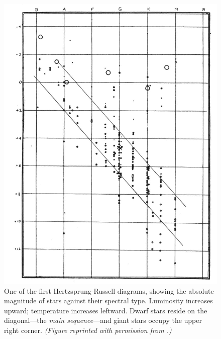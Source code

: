 \begin{figure}
    \centering
    \includegraphics[width=\textwidth]{pics/old_hr.png}
    \caption[Historical Hertzsprung-Russell Diagram]{One of the first Hertzsprung-Russell diagrams, showing the absolute magnitude of stars against their spectral type. 
        Luminosity increases upward; temperature increases leftward. 
        Dwarf stars reside on the diagonal---the \emph{main sequence}---and giant stars occupy the upper right corner. 
        \emph{(Figure reprinted with permission from \citealt{1914Natur..93..252R}.)} 
        \label{fig:HRD}}
\end{figure}



